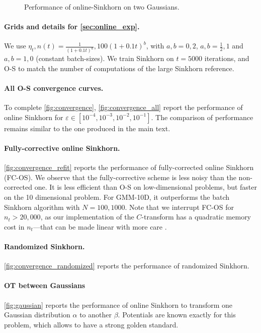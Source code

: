 \begin{figure}[t]
    \caption{Performance of online-Sinkhorn on two Gaussians.}
    \label{fig:gaussian}
\end{figure}

\paragraph{Grids and details for \autoref{sec:online_exp}.} We use $\eta_t, n(t)
= \frac{1}{(1 + 0.1t)^a}, 100 (1 + 0.1t)^{b}$, with $a, b = 0, 2$, $a, b =
\frac{1}{2}, 1$ and $a,b =1, 0$ (constant batch-sizes). We train Sinkhorn on $t
= 5000$ iterations, and O-S to match the number of computations of the large
Sinkhorn reference.

\paragraph{All O-S convergence curves.} To complete \autoref{fig:convergence}, \autoref{fig:convergence_all} report the
performance of online Sinkhorn for $\varepsilon \in [10^{-4}, 10^{-3}, 10^{-2},
10^{-1}]$. The comparison of performance remains similar to the one produced in the main text.

\paragraph{Fully-corrective online Sinkhorn.}\autoref{fig:convergence_refit} reports the performance of
fully-corrected online Sinkhorn (FC-OS). We observe that the fully-corrective scheme is less noisy than the
non-corrected one. It is less efficient than O-S on low-dimensional problems,
but faster on the 10 dimensional problem. For GMM-10D, it outperforms the batch Sinkhorn algorithm
with $N=100, 1000$. Note that we interrupt FC-OS for $n_t > 20,000$, as our implementation of the $C$-transform has a quadratic memory cost in $n_t$---that can be made linear with more care \cite{}.

\paragraph{Randomized Sinkhorn.}\autoref{fig:convergence_randomized} reports
the performance of randomized Sinkhorn.

\paragraph{OT between Gaussians}\autoref{fig:gaussian} reports the performance of online Sinkhorn to transform one Gaussian distribution $\alpha$ to another $\beta$. Potentials are known exactly for this problem, which allows to have a strong golden standard.

